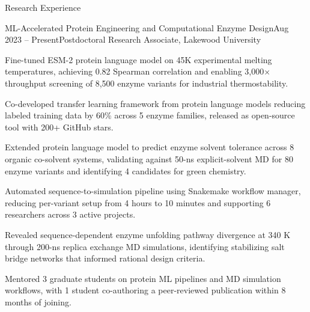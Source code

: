 \documentclass{resume}
\begin{document}
\begin{rSection}{Research Experience}

\begin{rSubsection}{ML-Accelerated Protein Engineering and Computational Enzyme Design}{\textcolor{black!60}{Aug 2023 -- Present}}{Postdoctoral Research Associate, Lakewood University}{}
\item Fine-tuned ESM-2 protein language model on 45K experimental melting temperatures, achieving 0.82 Spearman correlation and enabling 3,000$\times$ throughput screening of 8,500 enzyme variants for industrial thermostability.
\item Co-developed transfer learning framework from protein language models reducing labeled training data by 60\% across 5 enzyme families, released as open-source tool with 200+ GitHub stars.
\item Extended protein language model to predict enzyme solvent tolerance across 8 organic co-solvent systems, validating against 50-ns explicit-solvent MD for 80 enzyme variants and identifying 4 candidates for green chemistry.
\item Automated sequence-to-simulation pipeline using Snakemake workflow manager, reducing per-variant setup from 4 hours to 10 minutes and supporting 6 researchers across 3 active projects.
\item Revealed sequence-dependent enzyme unfolding pathway divergence at 340 K through 200-ns replica exchange MD simulations, identifying stabilizing salt bridge networks that informed rational design criteria.
\item Mentored 3 graduate students on protein ML pipelines and MD simulation workflows, with 1 student co-authoring a peer-reviewed publication within 8 months of joining.
\end{rSubsection}


\end{rSection}
\end{document}
